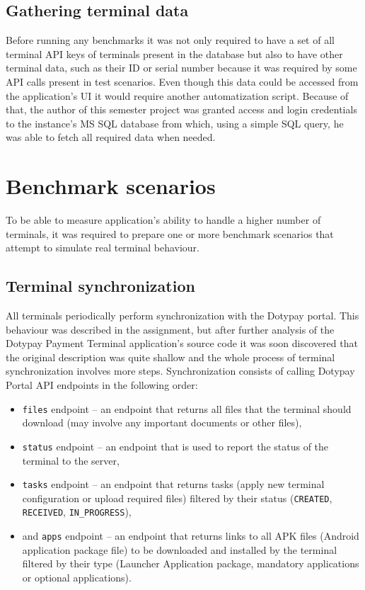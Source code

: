 \documentclass[12pt, a4paper]{article}
\let\oldsection\section
\renewcommand\section{\clearpage\oldsection}
\begin{document}
\subsection{Gathering terminal data}

Before running any benchmarks it was not only required to have a set of all terminal API keys of terminals present in the database but also to have other terminal data, such as their ID or serial number because it was required by some API calls present in test scenarios.
Even though this data could be accessed from the application's UI it would require another automatization script.
Because of that, the author of this semester project was granted access and login credentials to the instance's MS SQL database from which, using a simple SQL query, he was able to fetch all required data when needed.


\section{Benchmark scenarios}

To be able to measure application's ability to handle a higher number of terminals, it was required to prepare one or more benchmark scenarios that attempt to simulate real terminal behaviour.


\subsection{Terminal synchronization}

All terminals periodically perform synchronization with the Dotypay portal.
This behaviour was described in the assignment, but after further analysis of the Dotypay Payment Terminal application's source code it was soon discovered that the original description was quite shallow and the whole process of terminal synchronization involves more steps.
Synchronization consists of calling Dotypay Portal API endpoints in the following order:

\begin{itemize}
    \item \texttt{files} endpoint -- an endpoint that returns all files that the terminal should download (may involve any important documents or other files),
    \item \texttt{status} endpoint -- an endpoint that is used to report the status of the terminal to the server,
    \item \texttt{tasks} endpoint -- an endpoint that returns tasks (apply new terminal configuration or upload required files) filtered by their status (\texttt{CREATED}, \texttt{RECEIVED}, \texttt{IN\_PROGRESS}),
    \item and \texttt{apps} endpoint -- an endpoint that returns links to all APK files (Android application package file) to be downloaded and installed by the terminal filtered by their type (Launcher Application package, mandatory applications or optional applications).
\end{itemize}
\end{document}
